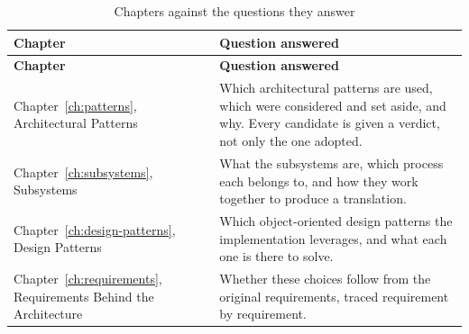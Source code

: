 \begin{longtable}{L{0.30\textwidth}L{0.62\textwidth}}
	\caption{Chapters against the questions they answer}\label{tab:organisation}\\
	\toprule
	\textbf{Chapter} & \textbf{Question answered} \\
	\midrule
	\endfirsthead
	\toprule
	\textbf{Chapter} & \textbf{Question answered} \\
	\midrule
	\endhead

	Chapter~\ref{ch:patterns}, Architectural Patterns & Which architectural
	patterns are used, which were considered and set aside, and why. Every
	candidate is given a verdict, not only the one adopted. \\
	\addlinespace
	Chapter~\ref{ch:subsystems}, Subsystems & What the subsystems are, which
	process each belongs to, and how they work together to produce a
	translation. \\
	\addlinespace
	Chapter~\ref{ch:design-patterns}, Design Patterns & Which object-oriented
	design patterns the implementation leverages, and what each one is there
	to solve. \\
	\addlinespace
	Chapter~\ref{ch:requirements}, Requirements Behind the Architecture &
	Whether these choices follow from the original requirements, traced
	requirement by requirement. \\
	\bottomrule
\end{longtable}
